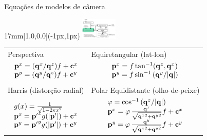 \begin{frame}{Equações de modelos de câmera}
  \begin{textblock*}{17mm}[1.0,0.0](\paperwidth-1px,1px)
    \includegraphics[width=17mm]{blocos_s2.png}
  \end{textblock*}
  \begin{center}
    \begin{tabular}{ll}
      Perspectiva & Equiretangular (lat-lon)\\
      \multicolumn{1}{c}{
        $\begin{array}{l}
        {{\mathbf{p}}}^x = ({\mathbf{q}}^x/{\mathbf{q}}^z)f + {\mathbf{c}}^x\\
        {{\mathbf{p}}}^y = ({\mathbf{q}}^y/{\mathbf{q}}^z)f + {\mathbf{c}}^y
      \end{array}$}
      &
      \multicolumn{1}{c}{
      $\begin{array}{l}
        {\mathbf{p}}^x = f \tan^{-1}({\mathbf{q}}^z, {\mathbf{q}}^x)\\
        {\mathbf{p}}^y = f \sin^{-1}\left({\mathbf{q}}^y / |{\mathbf{q}}| \right)
      \end{array}$}
      \\[\baselineskip]\\
      Harris (distorção radial) & Polar Equidistante (olho-de-peixe)\\
      \multicolumn{1}{c}{
      $\begin{array}{l}
        \label{eqn:raddist}
        g(x)=\frac{1}{\sqrt{1-2\kappa x^2}}\\
        {\mathbf{p}}^x = {{\mathbf{p}}^\prime}^x g(|\mathbf{{\mathbf{p}}^\prime}|) + {\mathbf{c}}^x\\
        {\mathbf{p}}^y = {{\mathbf{p}}^\prime}^y g(|\mathbf{{\mathbf{p}}^\prime}|) + {\mathbf{c}}^y
      \end{array}$}
      &
      \multicolumn{1}{c}{
      $\begin{array}{l}
        \varphi = \cos^{-1}\left({\mathbf{q}}^z /  |{\mathbf{q}}| \right)\\
        {\mathbf{p}}^x = \varphi\, \frac{{\mathbf{q}}^x}{\sqrt{{{\mathbf{q}}^x}^2+{{\mathbf{q}}^y}^2}}f+{\mathbf{c}}^x\\
        {\mathbf{p}}^y = \varphi\, \frac{{\mathbf{q}}^y}{\sqrt{{{\mathbf{q}}^x}^2+{{\mathbf{q}}^y}^2}}f+{\mathbf{c}}^y
      \end{array}$}
    \end{tabular}
  \end{center}
\end{frame}


